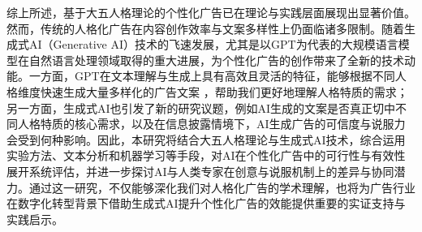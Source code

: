 综上所述，基于大五人格理论的个性化广告已在理论与实践层面展现出显著价值。然而，传统的人格化广告在内容创作效率与文案多样性上仍面临诸多限制。随着生成式AI（Generative AI）技术的飞速发展，尤其是以GPT为代表的大规模语言模型在自然语言处理领域取得的重大进展，为个性化广告的创作带来了全新的技术动能。一方面，GPT在文本理解与生成上具有高效且灵活的特征，能够根据不同人格维度快速生成大量多样化的广告文案 \citep{matz2024potential}，帮助我们更好地理解人格特质的需求；另一方面，生成式AI也引发了新的研究议题，例如AI生成的文案是否真正切中不同人格特质的核心需求，以及在信息披露情境下，AI生成广告的可信度与说服力会受到何种影响。因此，本研究将结合大五人格理论与生成式AI技术，综合运用实验方法、文本分析和机器学习等手段，对AI在个性化广告中的可行性与有效性展开系统评估，并进一步探讨AI与人类专家在创意与说服机制上的差异与协同潜力。通过这一研究，不仅能够深化我们对人格化广告的学术理解，也将为广告行业在数字化转型背景下借助生成式AI提升个性化广告的效能提供重要的实证支持与实践启示。






